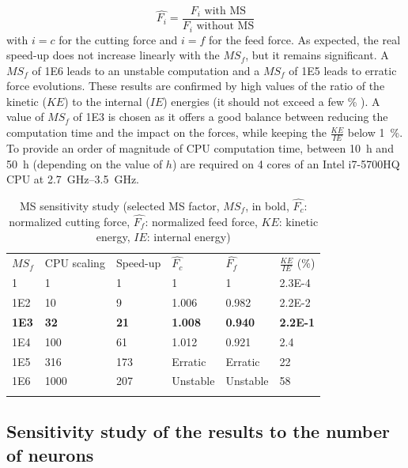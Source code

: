 \documentclass[preprint,12pt,times]{elsarticle}
\newcommand{\snsp}[2]{{#1}_{\!#2}}    %
\newcommand{\dnsp}[2]{{#1}_{\!\!#2}}  %
\begin{document}
\begin{equation}
\hat{F_i} = \frac{F_i\text{ with MS}}{F_i\text{ without MS}}
\end{equation}
%
with $i = c$ for the cutting force and $i = f$ for the feed force. As expected, the real speed-up does not increase linearly with the $\dnsp{MS}{f}$, but it remains significant. A $\dnsp{MS}{f}$ of \num{1E6} leads to an unstable computation and a $\dnsp{MS}{f}$ of \num{1E5} leads to erratic force evolutions. These results are confirmed by high values of the ratio of the kinetic ($KE$) to the internal ($IE$) energies (it should not exceed a few \unit{\%} \cite{wang_Investigation_2011, ducobu_Introduction_2015}). A value of $\dnsp{MS}{f}$ of 1E3 is chosen as it offers a good balance between reducing the computation time and the impact on the forces, while keeping the $\frac{KE}{IE}$ below \qty{1}{\%}. To provide an order of magnitude of CPU computation time, between \qty{10}{\hour} and \qty{50}{\hour} (depending on the value of $h$) are required on 4 cores of an Intel i7-5700HQ CPU at \qtyrange{2.7}{3.5}{\GHz}.
%
\begin{table}[!h]
\begin{center}
\caption{\label{tab:MS} MS sensitivity study (selected MS factor, $\dnsp{MS}{f}$, in bold, $\hat{\snsp{F}{c}}$: normalized cutting force, $\hat{\snsp{F}{f}}$: normalized feed force, $KE$: kinetic energy, $IE$: internal energy)}
\begin{tabular}{llllll}
\hline\noalign{\smallskip}
$\dnsp{MS}{f}$ & CPU scaling & Speed-up & $\hat{\snsp{F}{c}}$ & $\hat{\snsp{F}{f}}$ & $\frac{KE}{IE}$ (\unit{\%})\\
\noalign{\smallskip}\hline\noalign{\smallskip}
1 & 1 & 1 & 1 & 1 & \num{2.3E-4}\\
\num{1E2} & 10 & 9 & 1.006 & 0.982 & \num{2.2E-2}\\
\textbf{\num{1E3}} & \textbf{32} & \textbf{21} & \textbf{1.008} & \textbf{0.940} & \textbf{\num{2.2E-1}}\\
\num{1E4} & 100 & 61 & 1.012 & 0.921 & 2.4\\
\num{1E5} & 316 & 173 & Erratic & Erratic & 22\\
\num{1E6} & 1000 & 207 & Unstable & Unstable & 58\\
\noalign{\smallskip}\hline
\end{tabular}
\end{center}
\end{table}
%

\subsection{Sensitivity study of the results to the number of neurons}
\label{subsec:nberneu}
\end{document}
